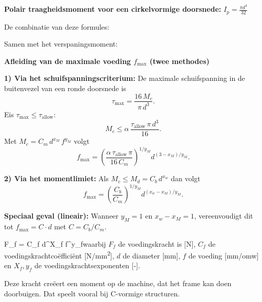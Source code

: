 \documentclass[a4paper,11pt,twoside]{report}
\begin{document}
\textbf{Polair traagheidsmoment voor een cirkelvormige doorsnede:} $I_p = \frac{\pi d^4}{32}$

De combinatie van deze formules:


\vspace{0.5cm}



Samen met het verspaningsmoment:

\textbf{Afleiding van de maximale voeding $f_{\max}$ (twee methodes)}

\textbf{1) Via het schuifspanningscriterium:}
De maximale schuifspanning in de buitenvezel van een ronde doorsnede is
\[
    \tau_{\max}=\dfrac{16\,M_c}{\pi\,d^3}.
\]
Eis \(\tau_{\max}\le\tau_{\mathrm{allow}}\):
\[
    M_c \le \alpha\,\dfrac{\tau_{\mathrm{allow}}\,\pi\,d^3}{16}.
\]
Met \(M_c = C_m\,d^{x_M}\,f^{y_M}\) volgt
\[
    f_{\max} = \left(\dfrac{\alpha\,\tau_{\mathrm{allow}}\,\pi}{16\,C_m}\right)^{1/y_M} d^{(3-x_M)/y_M}.
\]

\textbf{2) Via het momentlimiet:}
Als \(M_c\le M_d=C_b\,d^{x_w}\) dan volgt
\[
    f_{\max} = \left(\dfrac{C_b}{C_m}\right)^{1/y_M} d^{(x_w-x_M)/y_M}.
\]

\textbf{Speciaal geval (lineair):} Wanneer $y_M = 1$ en $x_w - x_M = 1$, vereenvoudigt dit tot $f_{\max} = C \cdot d$ met $C = C_b / C_m$.




{F_f = C_f \cdot d^{X_f} \cdot f^{y_f}}{waarbij $F_f$ de voedingskracht is [\si{N}], $C_f$ de voedingskrachtcoëfficiënt [\si{N/mm^2}],
$d$ de diameter [\si{mm}], $f$ de voeding [\si{mm/omw}] en $X_f, y_f$ de voedingskrachtsexponenten [-].}

Deze kracht creëert een moment op de machine, dat het frame kan doen doorbuigen.
Dat speelt vooral bij C-vormige structuren.
\end{document}
